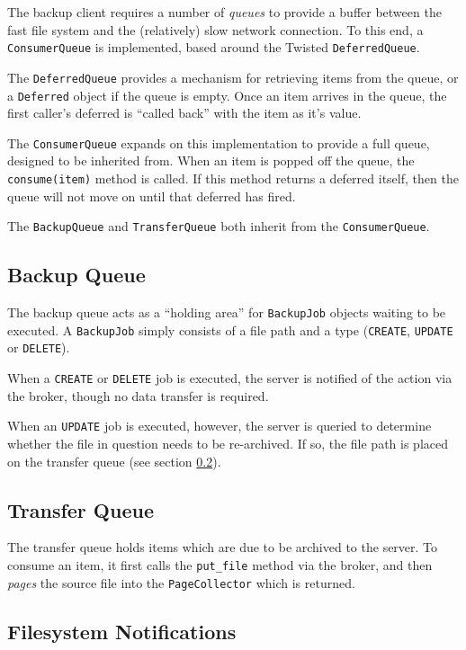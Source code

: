 The backup client requires a number of \emph{queues} to provide a buffer
between the fast file system and the (relatively) slow network connection. To
this end, a \verb!ConsumerQueue! is implemented, based around the Twisted
\verb!DeferredQueue!.

The \verb!DeferredQueue! provides a mechanism for retrieving items from the
queue, or a \verb!Deferred! object if the queue is empty. Once an item arrives
in the queue, the first caller's deferred is ``called back'' with the item as
it's value.

The \verb!ConsumerQueue! expands on this implementation to provide a full
queue, designed to be inherited from. When an item is popped off the queue, the
\verb!consume(item)! method is called. If this method returns a deferred
itself, then the queue will not move on until that deferred has fired.

The \verb!BackupQueue! and \verb!TransferQueue! both inherit from the
\verb!ConsumerQueue!.

\subsection{Backup Queue}
\label{sec:implementation-backup-queue}

The backup queue acts as a ``holding area'' for \verb!BackupJob! objects
waiting to be executed. A \verb!BackupJob! simply consists of a file path and
a type (\verb!CREATE!, \verb!UPDATE! or \verb!DELETE!).

When a \verb!CREATE! or \verb!DELETE! job is executed, the server is notified
of the action via the broker, though no data transfer is required.

When an \verb!UPDATE! job is executed, however, the server is queried to
determine whether the file in question needs to be re-archived. If so, the file
path is placed on the transfer queue (see section
\ref{sec:implementation-transfer-queue}).

\subsection{Transfer Queue}
\label{sec:implementation-transfer-queue}

The transfer queue holds items which are due to be archived to the server. To
consume an item, it first calls the \verb!put_file! method via the broker, and
then \emph{pages} the source file into the \verb!PageCollector! which is
returned.

\subsection{Filesystem Notifications}
\label{sec:implementation-filesystem-notifications}

